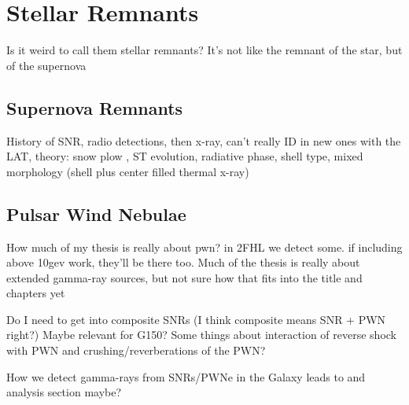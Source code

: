 \chapter{Stellar Remnants}
\label{chap:Rems}
Is it weird to call them stellar remnants? It's not like the remnant of the star, but of the supernova
\section{Supernova Remnants}
History of SNR,  radio detections, then x-ray, can't really ID in new ones with the LAT, theory: snow plow , ST evolution, radiative phase, shell type, mixed morphology (shell plus center filled thermal x-ray) 
\section{Pulsar Wind Nebulae}
How much of my thesis is really about pwn? in 2FHL we detect some. if including above 10gev work, they'll be there too. Much of the thesis is really about extended gamma-ray sources, but not sure how that fits into the title and chapters yet

Do I need to get into composite SNRs (I think composite means SNR + PWN right?) Maybe relevant for G150? Some things about interaction of reverse shock with PWN and crushing/reverberations of the PWN?

How we detect gamma-rays from SNRs/PWNe in the Galaxy leads to and analysis section maybe?